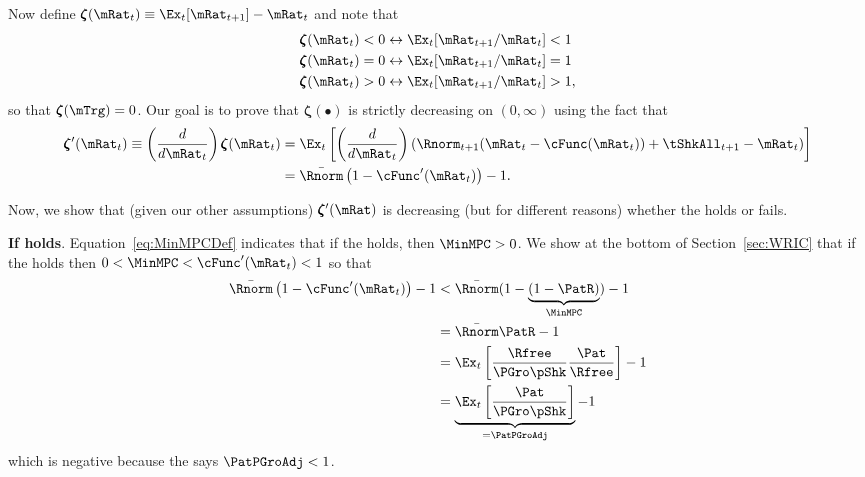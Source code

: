 \documentclass[\econtexRoot/BufferStockTheory]{subfiles}
\begin{document}
Now define \providecommand{\difFunc}{\pmb{\zeta}} $\difFunc(\mRat_t) \equiv 
\Ex_t[\mRat_{t+1}] - \mRat_t$ and note that
\begin{align}\label{eq:difRatioEquiv}
  \difFunc(\mRat_t) < 0 &\leftrightarrow \Ex_t[{\mRat}_{t+1}/\mRat_t] < 1 
                          \nonumber\\
  \difFunc(\mRat_t) = 0 &\leftrightarrow \Ex_t[{\mRat}_{t+1}/\mRat_t] = 1\\
  \difFunc(\mRat_t) > 0 &\leftrightarrow \Ex_t[{\mRat}_{t+1}/\mRat_t] > 
                          1,\nonumber
\end{align}
so that $\difFunc(\mTrg)=0$. Our goal is to prove that $\difFunc(\bullet)$ is strictly 
decreasing on $(0,\infty)$ using the fact that
\begin{align}
  \difFunc^{\prime}(\mRat_{t}) \equiv  \left( \frac{d}{d\mRat_{t}}\right) \difFunc(\mRat_t)  & = \Ex_{t}\left[
                                                                                               \left( \frac{d}{d\mRat_{t}}\right) \left( 
                                                                                               {\Rnorm}_{t+1}(\mRat_{t}-\cFunc(\mRat_{t}))+%
                                                                                               {\tShkAll}_{t+1} - {\mRat}_t\right) \right] \label{eq:difFuncmRatDecreases} \\
                                                                                             & = \bar{\Rnorm}\left(1-\cFunc^{\prime}({\mRat}_t)\right) - 1.  \notag
\end{align}

Now, we show that (given our other assumptions) $\difFunc^{\prime}(\mRat)$ is decreasing (but for different reasons) whether the {\RIC} holds or fails.

\textbf{If {\RIC} holds}. Equation~\eqref{eq:MinMPCDef} indicates that if the {\RIC} holds, then $\MinMPC >0$.  We show at the bottom of Section~\ref{sec:WRIC} that if the {\RIC} holds then $0 < \MinMPC < \cFunc^{\prime}(\mRat_{t}) < 1$ so that 
\begin{align*}
  \bar{\Rnorm}\left(1-\cFunc^{\prime}({\mRat}_t)\right) - 1 & <  \bar{\Rnorm}(1-\underbrace{(1-\PatR)}_{\MinMPC}) - 1  \\
                                                            & = \bar{\Rnorm}\PatR - 1 \\
                                                            & = \Ex_{t}\left[\frac{\Rfree}{\PGro \pShk}\frac{\Pat}{\Rfree}\right] - 1 \\
                                                            & = \underbrace{\Ex_{t}\left[\frac{\Pat}{\PGro \pShk}\right]}_{= \PatPGroAdj} - 1 
\end{align*}
which is negative because the {\GICNrm} says $\PatPGroAdj < 1$.  
\end{document}
